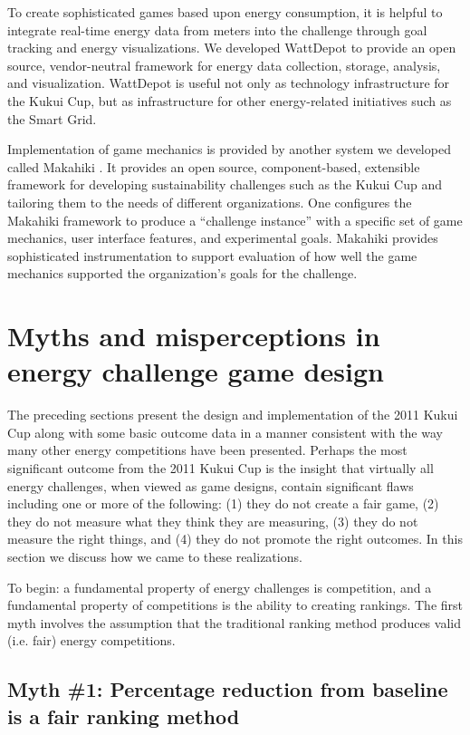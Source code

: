 \documentclass[jou]{apa} %
\begin{document}
To create sophisticated games based upon energy consumption, it is helpful to integrate
real-time energy data from meters into the challenge through goal tracking and energy
visualizations. We developed WattDepot \cite{csdl2-10-05} to provide an open
source, vendor-neutral framework for energy data collection, storage, analysis, and
visualization.  WattDepot is useful not only as technology infrastructure for the Kukui
Cup, but as infrastructure for other energy-related initiatives such as the Smart Grid.

Implementation of game mechanics is provided by another system we developed called
Makahiki \cite{csdl2-11-07}.  It provides an open source, component-based, extensible
framework for developing sustainability challenges such as the Kukui Cup and tailoring
them to the needs of different organizations.  One configures the Makahiki framework to
produce a ``challenge instance'' with a specific set of game mechanics, user interface
features, and experimental goals.  Makahiki provides sophisticated instrumentation to
support evaluation of how well the game mechanics supported the organization's goals for
the challenge.

\section{Myths and misperceptions in energy challenge game design}

The preceding sections present the design and implementation of the 2011 Kukui Cup along
with some basic outcome data in a manner consistent with the way many other energy
competitions have been presented.  Perhaps the most significant outcome from the 2011
Kukui Cup is the insight that virtually all energy challenges, when viewed as game
designs, contain significant flaws including one or more of the following: (1) they do not
create a fair game, (2) they do not measure what they think they are measuring, (3) they do not
measure the right things, and (4) they do not promote the right outcomes.  In this section we
discuss how we came to these realizations.

To begin: a fundamental property of energy challenges is competition, and a fundamental
property of competitions is the ability to creating rankings.  The first myth involves the
assumption that the traditional ranking method produces valid (i.e. fair) energy competitions.

\subsection{Myth \#1: Percentage reduction from baseline is a fair ranking method}
\end{document}
